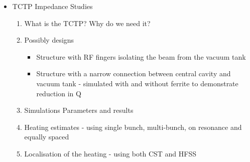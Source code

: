 
\begin{itemize}
\item{TCTP Impedance Studies}
\begin{enumerate}
\item{What is the TCTP? Why do we need it?}
\item{Possibly designs}
\begin{itemize}
\item{Structure with RF fingers isolating the beam from the vacuum tank}
\item{Structure with a narrow connection between central cavity and vacuum tank - simulated with and without ferrite to demonstrate reduction in Q}
\end{itemize}
\item{Simulations Parameters and results}
\item{Heating estimates - using single bunch, multi-bunch, on resonance and equally spaced}
\item{Localisation of the heating - using both CST and HFSS}

\end{enumerate}
\end{itemize}
%
%
%
%
%
%


